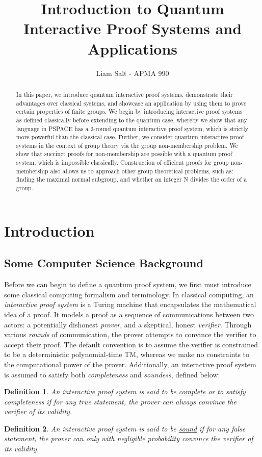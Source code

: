 \documentclass[12pt]{article}
\title{Introduction to Quantum Interactive Proof Systems and Applications}
\author{Liam Salt - APMA 990}
\newtheorem{defn}{Definition}
\numberwithin{thm}{section}
\numberwithin{defn}{section}
\numberwithin{prop}{section}
\numberwithin{rmk}{section}
\begin{document}
	\maketitle
	
	\begin{abstract}
		In this paper, we introduce quantum interactive proof systems, demonstrate their advantages over classical systems, and showcase an application by using them to prove certain properties of finite groups. We begin by introducing interactive proof systems as defined classically before extending to the quantum case, whereby we show that any language in PSPACE has a $2$-round quantum interactive proof system, which is strictly more powerful than the classical case. Further, we consider quantum interactive proof systems in the context of group theory via the group non-membership problem. We show that succinct proofs for non-membership are possible with a quantum proof system, which is impossible classically. Construction of efficient proofs for group non-membership also allows us to approach other group theoretical problems, such as: finding the maximal normal subgroup, and whether an integer N divides the order of a group.
	\end{abstract}
	\section{Introduction}
	
	\subsection{Some Computer Science Background}
	
	Before we can begin to define a quantum proof system, we first must introduce some classical computing formalism and terminology. In classical computing, an \textit{interactive proof system} is a Turing machine that encapsulates the mathematical idea of a proof. It models a proof as a sequence of communications between two actors: a potentially dishonest \textit{prover}, and a skeptical, honest \textit{verifier}. Through various \textit{rounds} of communication, the prover attempts to convince the verifier to accept their proof. The default convention is to assume the verifier is constrained to be a deterministic polynomial-time TM, whereas we make no constraints to the computational power of the prover. Additionally, an interactive proof system is assumed to satisfy both \textit{completeness} and \textit{soundess}, defined below:
	\begin{defn}
		An interactive proof system is said to be \underline{complete} or to satisfy completeness if for any true statement, the prover can always convince the verifier of its validity.
	\end{defn}
	\begin{defn} An interactive proof system is said to be \underline{sound} if for any false statement, the prover can only with negligible probability convince the verifier of its validity.
	\end{defn}
\end{document}
